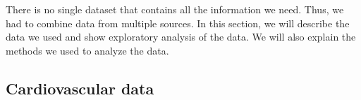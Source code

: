 
There is no single dataset that contains all the information we need. Thus, we had to combine data from multiple sources. In this section, we will describe the data we used 
and show exploratory analysis of the data. We will also explain the methods we used to analyze the data.

% 

\subsection{Cardiovascular data}\label{sec:cardiovascular_data}

